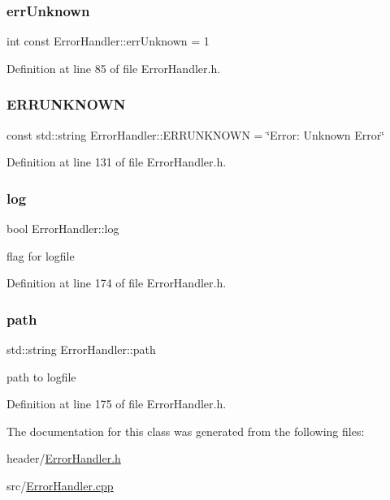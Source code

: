 \subsubsection{\texorpdfstring{errUnknown}{errUnknown}}
{\footnotesize\ttfamily int const Error\+Handler\+::err\+Unknown = 1\hspace{0.3cm}{\ttfamily [static]}}



Definition at line 85 of file Error\+Handler.\+h.

\mbox{\label{classErrorHandler_a9530db091517e099bc9bad620390c31d}} 
\subsubsection{\texorpdfstring{ERRUNKNOWN}{ERRUNKNOWN}}
{\footnotesize\ttfamily const std\+::string Error\+Handler\+::\+E\+R\+R\+U\+N\+K\+N\+O\+WN = \char`\"{}Error\+: Unknown Error\char`\"{}\hspace{0.3cm}{\ttfamily [static]}}



Definition at line 131 of file Error\+Handler.\+h.

\mbox{\label{classErrorHandler_ad1dc2ca6c4b226730361cc8d7b786e30}} 
\subsubsection{\texorpdfstring{log}{log}}
{\footnotesize\ttfamily bool Error\+Handler\+::log\hspace{0.3cm}{\ttfamily [private]}}

flag for logfile 

Definition at line 174 of file Error\+Handler.\+h.

\mbox{\label{classErrorHandler_aeabbc987b7eaa01b6d006b55b4e00574}} 
\subsubsection{\texorpdfstring{path}{path}}
{\footnotesize\ttfamily std\+::string Error\+Handler\+::path\hspace{0.3cm}{\ttfamily [private]}}

path to logfile 

Definition at line 175 of file Error\+Handler.\+h.



The documentation for this class was generated from the following files\+:\begin{DoxyCompactItemize}
\item 
header/\mbox{\hyperlink{ErrorHandler_8h}{Error\+Handler.\+h}}\item 
src/\mbox{\hyperlink{ErrorHandler_8cpp}{Error\+Handler.\+cpp}}\end{DoxyCompactItemize}
